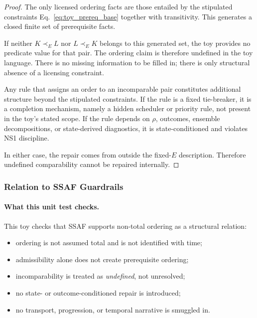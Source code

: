 \documentclass[aps,prx,onecolumn,11pt]{revtex4-2}
\theoremstyle{plain}
\theoremstyle{definition}
\theoremstyle{remark}
\begin{document}
\begin{proof}
The only licensed ordering facts are those entailed by the stipulated
constraints Eq.~\eqref{eq:toy_prereq_base} together with transitivity.
This generates a closed finite set of prerequisite facts.

If neither \(K\prec_E L\) nor \(L\prec_E K\) belongs to this generated
set, the toy provides no predicate value for that pair. The ordering
claim is therefore undefined in the toy language. There is no missing
information to be filled in; there is only structural absence of a
licensing constraint.

Any rule that assigns an order to an incomparable pair constitutes
additional structure beyond the stipulated constraints. If the rule is
a fixed tie-breaker, it is a completion mechanism, namely a hidden
scheduler or priority rule, not present in the toy's stated scope. If
the rule depends on \(\rho\), outcomes, ensemble decompositions, or
state-derived diagnostics, it is state-conditioned and violates NS1
discipline.

In either case, the repair comes from outside the fixed-\(E\)
description. Therefore undefined comparability cannot be repaired
internally.
\end{proof}

\subsubsection{Relation to SSAF Guardrails}
\label{toy:nontotal_ordering:guardrails}

\paragraph{What this unit test checks.}

This toy checks that SSAF supports non-total ordering as a structural
relation:

\begin{itemize}
\item ordering is not assumed total and is not identified with time;
\item admissibility alone does not create prerequisite ordering;
\item incomparability is treated as \emph{undefined}, not unresolved;
\item no state- or outcome-conditioned repair is introduced;
\item no transport, progression, or temporal narrative is smuggled in.
\end{itemize}
\end{document}
